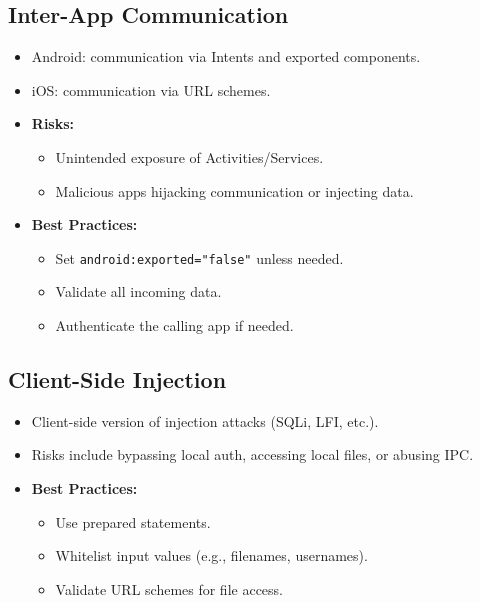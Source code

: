 \subsection{Inter-App Communication}{
\begin{itemize}[noitemsep]
  \item Android: communication via Intents and exported components.
  \item iOS: communication via URL schemes.
  \item \textbf{Risks:}
    \begin{itemize}[noitemsep]
      \item Unintended exposure of Activities/Services.
      \item Malicious apps hijacking communication or injecting data.
    \end{itemize}
  \item \textbf{Best Practices:}
    \begin{itemize}[noitemsep]
      \item Set \texttt{android:exported="false"} unless needed.
      \item Validate all incoming data.
      \item Authenticate the calling app if needed.
    \end{itemize}
\end{itemize}}

\subsection{Client-Side Injection}{
\begin{itemize}[noitemsep]
  \item Client-side version of injection attacks (SQLi, LFI, etc.).
  \item Risks include bypassing local auth, accessing local files, or abusing IPC.
  \item \textbf{Best Practices:}
    \begin{itemize}[noitemsep]
      \item Use prepared statements.
      \item Whitelist input values (e.g., filenames, usernames).
      \item Validate URL schemes for file access.
    \end{itemize}
\end{itemize}
}
